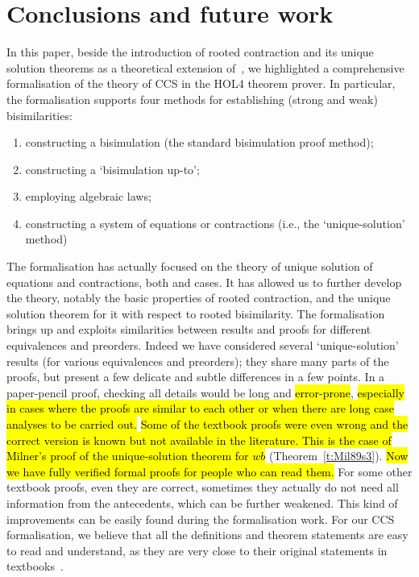 
\section{Conclusions and future work}
\label{s:concl}

In this paper, beside the introduction of rooted contraction and its
unique solution theorems as a theoretical extension
of~\cite{sangiorgi2017equations},
we highlighted a comprehensive formalisation of the theory of CCS in the 
HOL4 theorem prover. In particular, the formalisation supports four
methods for establishing (strong and weak) bisimilarities:
\begin{enumerate}
\item constructing a bisimulation (the standard bisimulation proof
method);
\item constructing a `bisimulation up-to'; 
\item employing algebraic laws;
\item constructing a system of equations or contractions
(i.e., the `unique-solution' method)
\end{enumerate}

The formalisation has actually focused on the theory of
unique solution of equations and contractions, both \univariate and
\multivariate cases. It    
 has allowed us to further develop the theory,
notably the basic properties of rooted contraction, and the unique
solution theorem for it with respect to rooted bisimilarity. 
The formalisation brings up and exploits similarities between results
and proofs for different equivalences and preorders. Indeed we have
considered several `unique-solution' results (for various equivalences
and preorders); they share many parts of the proofs, but present a few
delicate and subtle differences in a few points. In a paper-pencil
proof, checking all details would be long and \hl{error-prone},
\hl{especially in cases where the proofs are similar to each other or
  when there are long case analyses to be carried out.}
\hl{Some of the textbook proofs were even wrong and the correct version is
known but not available in the literature. This is the case of Milner's
proof of the unique-solution theorem for $wb$}
(Theorem~\ref{t:Mil89s3}). \hl{Now we have fully verified formal proofs for
people who can read them.}
For some other textbook proofs, even they are correct, sometimes they actually
do not need all information from the antecedents, which can be further
weakened. This kind of improvements can be easily found during the
formalisation work.
For our CCS formalisation, we believe that all the definitions and
theorem statements are easy to read and
understand, as they are very close to their original statements in
textbooks~\cite{Gorrieri:2015jt,Mil89}.

